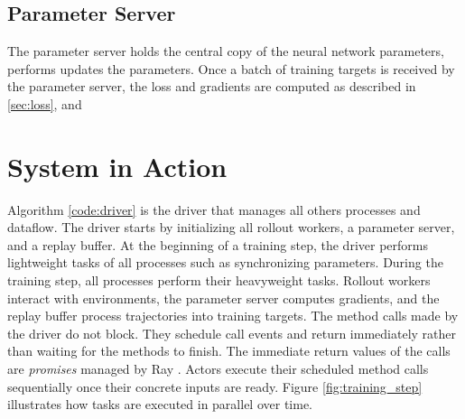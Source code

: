 \subsection{Parameter Server} \label{sec:param_server}
The parameter server holds the central copy of the neural network parameters, performs  updates the parameters.
Once a batch of training targets is received by the parameter server, the loss and gradients are computed as described in \ref{sec:loss}, and


\section{System in Action}
Algorithm \ref{code:driver} is the driver that manages all others processes and dataflow.
The driver starts by initializing all rollout workers, a parameter server, and a replay buffer.
At the beginning of a training step, the driver performs lightweight tasks of all processes such as synchronizing parameters.
During the training step, all processes perform their heavyweight tasks.
Rollout workers interact with environments, the parameter server computes gradients, and the replay buffer process trajectories into training targets.
The method calls made by the driver do not block.
They schedule call events and return immediately rather than waiting for the methods to finish.
The immediate return values of the calls are \textit{promises} managed by Ray \cite{FuturesPromises__2022}.
Actors execute their scheduled method calls sequentially once their concrete inputs are ready.
Figure \ref{fig:training_step} illustrates how tasks are executed in parallel over time.

